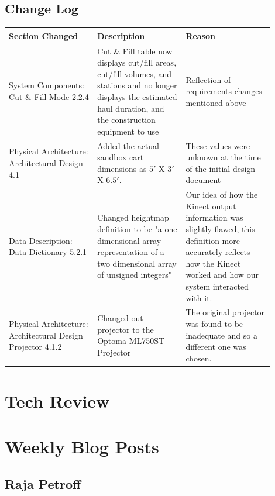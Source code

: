 \documentclass[onecolumn, draftclsnofoot,10pt, compsoc]{IEEEtran}
\def \GroupMemberOne{			Raja Petroff			}
\begin{document}
\subsection{Change Log}
\begin{tabular}{| p{0.3\linewidth}| p{0.3\linewidth}| p{0.3\linewidth}|}
\hline
 Section Changed & Description & Reason \\ \hline 
 System Components: Cut \& Fill Mode 2.2.4 & Cut \& Fill table now displays cut/fill areas, cut/fill volumes, and stations and no longer displays the estimated haul duration, and the construction equipment to use  & Reflection of requirements changes mentioned above \\ \hline
 Physical Architecture: Architectural Design 4.1 & Added the actual sandbox cart dimensions as $5'$ X $3'$ X $6.5'$. & These values were unknown at the time of the initial design document \\ \hline
 Data Description: Data Dictionary 5.2.1 & Changed heightmap definition to be "a one dimensional array representation of a two dimensional array of unsigned integers" & Our idea of how the Kinect output information was slightly flawed, this definition more accurately reflects how the Kinect worked and how our system interacted with it. \\ \hline
  Physical Architecture: Architectural Design Projector 4.1.2 & Changed out projector to the Optoma ML750ST Projector & The original projector was found to be inadequate and so a different one was chosen. \\ \hline
\end{tabular}

\pagebreak

\section{Tech Review}



\pagebreak

\section{Weekly Blog Posts}
\subsection{\GroupMemberOne}
\end{document}
